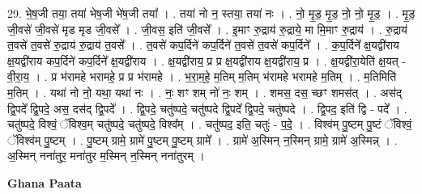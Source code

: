 \documentclass[17pt]{extarticle}
\begin{document}
29. भे॒ष॒जी तया॒ तया॑ भेष॒जी भे॑ष॒जी तया᳚ । . तया॑ नो न॒ स्तया॒ तया॑ नः । . नो॒ मृ॒ड॒ मृ॒ड॒ नो॒ नो॒ मृ॒ड॒ । . मृ॒ड॒ जी॒वसे॑ जी॒वसे॑ मृड मृड जी॒वसे᳚ । . जी॒वस॒ इति॑ जी॒वसे᳚ । . इ॒माꣳ रु॒द्राय॑ रु॒द्राये॒ मा मि॒माꣳ रु॒द्राय॑ । . रु॒द्राय॑ त॒वसे॑ त॒वसे॑ रु॒द्राय॑ रु॒द्राय॑ त॒वसे᳚ । . त॒वसे॑ कप॒र्दिने॑ कप॒र्दिने॑ त॒वसे॑ त॒वसे॑ कप॒र्दिने᳚ । . क॒प॒र्दिने᳚ क्ष॒यद्वी॑राय क्ष॒यद्वी॑राय कप॒र्दिने॑ कप॒र्दिने᳚ क्ष॒यद्वी॑राय । . क्ष॒यद्वी॑राय॒ प्र प्र क्ष॒यद्वी॑राय क्ष॒यद्वी॑राय॒ प्र । . क्ष॒यद्वी॑रा॒येति॑ क्ष॒यत् - वी॒रा॒य॒ । . प्र भ॑रामहे भरामहे॒ प्र प्र भ॑रामहे । . भ॒रा॒म॒हे॒ म॒तिम् म॒तिम् भ॑रामहे भरामहे म॒तिम् । . म॒तिमिति॑ म॒तिम् । . यथा॑ नो नो॒ यथा॒ यथा॑ नः । . नः॒ शꣳ शम् नो॑ नः॒ शम् । . शमस॒ दस॒ च्छꣳ शमस॑त् । . अस॑द् द्वि॒पदे᳚ द्वि॒पदे॒ अस॒ दस॑द् द्वि॒पदे᳚ । . द्वि॒पदे॒ चतु॑ष्पदे॒ चतु॑ष्पदे द्वि॒पदे᳚ द्वि॒पदे॒ चतु॑ष्पदे । . द्वि॒पद॒ इति॑ द्वि - पदे᳚ । . चतु॑ष्पदे॒ विश्वं॒ ॅविश्व॒म् चतु॑ष्पदे॒ चतु॑ष्पदे॒ विश्व᳚म् । . चतु॑ष्पद॒ इति॒ चतुः॑ - प॒दे॒ । . विश्व॑म् पु॒ष्टम् पु॒ष्टं ॅविश्वं॒ ॅविश्व॑म् पु॒ष्टम् । . पु॒ष्टम् ग्रामे॒ ग्रामे॑ पु॒ष्टम् पु॒ष्टम् ग्रामे᳚ । . ग्रामे॑ अ॒स्मिन् न॒स्मिन् ग्रामे॒ ग्रामे॑ अ॒स्मिन्न् । . अ॒स्मिन् नना॑तुर॒ मना॑तुर म॒स्मिन् न॒स्मिन् नना॑तुरम् । \newline

\textbf{Ghana Paata } \newline
\end{document}
